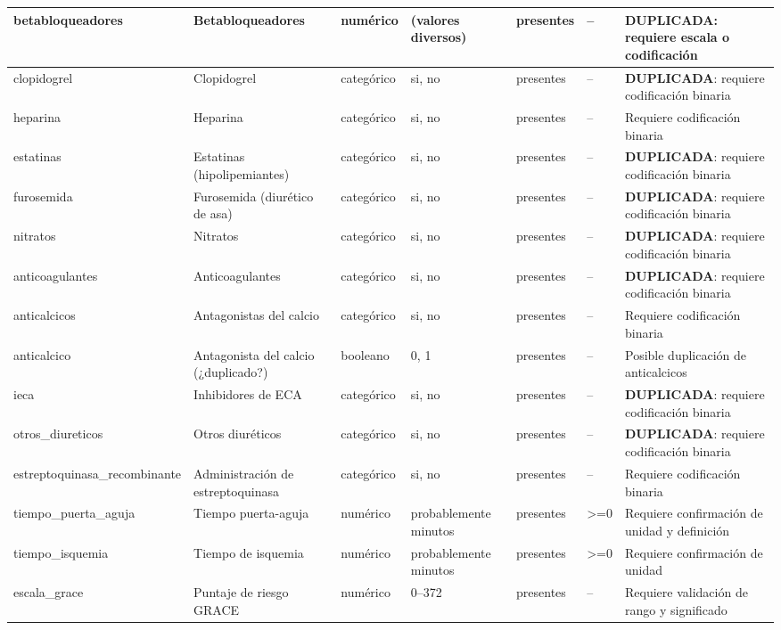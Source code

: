 \documentclass[11pt,a4paper]{article}
\begin{document}
\begin{longtable}{|L{0.095\textwidth}|L{0.17\textwidth}|L{0.07\textwidth}|L{0.16\textwidth}|L{0.14\textwidth}|L{0.13\textwidth}|L{0.15\textwidth}|}
betabloqueadores & Betabloqueadores & numérico & (valores diversos) & presentes & -- & \textbf{DUPLICADA}: requiere escala o codificación \\ \hline
clopidogrel & Clopidogrel & categórico & si, no & presentes & -- & \textbf{DUPLICADA}: requiere codificación binaria \\ \hline
heparina & Heparina & categórico & si, no & presentes & -- & Requiere codificación binaria \\ \hline
estatinas & Estatinas (hipolipemiantes) & categórico & si, no & presentes & -- & \textbf{DUPLICADA}: requiere codificación binaria \\ \hline
furosemida & Furosemida (diurético de asa) & categórico & si, no & presentes & -- & \textbf{DUPLICADA}: requiere codificación binaria \\ \hline
nitratos & Nitratos & categórico & si, no & presentes & -- & \textbf{DUPLICADA}: requiere codificación binaria \\ \hline
anticoagulantes & Anticoagulantes & categórico & si, no & presentes & -- & \textbf{DUPLICADA}: requiere codificación binaria \\ \hline
anticalcicos & Antagonistas del calcio & categórico & si, no & presentes & -- & Requiere codificación binaria \\ \hline
anticalcico & Antagonista del calcio (¿duplicado?) & booleano & 0, 1 & presentes & -- & Posible duplicación de anticalcicos \\ \hline
ieca & Inhibidores de ECA & categórico & si, no & presentes & -- & \textbf{DUPLICADA}: requiere codificación binaria \\ \hline
otros\_diureticos & Otros diuréticos & categórico & si, no & presentes & -- & \textbf{DUPLICADA}: requiere codificación binaria \\ \hline
estreptoquinasa\_recombinante & Administración de estreptoquinasa & categórico & si, no & presentes & -- & Requiere codificación binaria \\ \hline
tiempo\_puerta\_aguja & Tiempo puerta-aguja & numérico & probablemente minutos & presentes & >=0 & Requiere confirmación de unidad y definición \\ \hline
tiempo\_isquemia & Tiempo de isquemia & numérico & probablemente minutos & presentes & >=0 & Requiere confirmación de unidad \\ \hline
escala\_grace & Puntaje de riesgo GRACE & numérico & 0--372 & presentes & -- & Requiere validación de rango y significado \\ \hline

\end{longtable}
\end{document}
